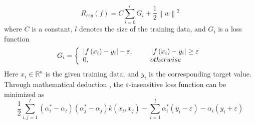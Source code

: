 \begin{equation}
{R_{reg}}\left( f \right) = C\sum\limits_{i = 0}^l {{G _i} +
    \frac{1}{2}{{\left\| w \right\|}^2}}
\label{eq:2}
\end{equation}
\textcolor{feb18rev}{where $C$ is a constant, $l$ denotes the size of
the training data, and ${G _i}$ is a loss function}
\begin{equation}
    {G _i} = \left\{ {\begin{array}{*{20}{l}} {\left| {f\left( {{x_i}} \right)
        - {y_i}} \right| - \varepsilon ,{\kern 1pt} {\kern 1pt} {\kern 1pt}
        {\kern 1pt} {\kern 1pt} {\kern 1pt} {\kern 1pt} {\kern 1pt} {\kern 1pt}
        {\kern 1pt} {\kern 1pt} {\kern 1pt} {\kern 1pt} {\kern 1pt} {\kern 1pt}
        {\kern 1pt} {\kern 1pt} {\kern 1pt} {\kern 1pt} {\kern 1pt} {\kern 1pt}
        {\kern 1pt} {\kern 1pt} {\kern 1pt} \left| {f\left( {{x_i}} \right) -
        {y_i}} \right| \ge \varepsilon }\\ {0,{\kern 1pt} {\kern 1pt} {\kern
        1pt} {\kern 1pt} {\kern 1pt} {\kern 1pt} {\kern 1pt} {\kern 1pt} {\kern
        1pt} {\kern 1pt} {\kern 1pt} {\kern 1pt} {\kern 1pt} {\kern 1pt} {\kern
        1pt} {\kern 1pt} {\kern 1pt} {\kern 1pt} {\kern 1pt} {\kern 1pt} {\kern
        1pt} {\kern 1pt} {\kern 1pt} {\kern 1pt} {\kern 1pt} {\kern 1pt} {\kern
        1pt} {\kern 1pt} {\kern 1pt} {\kern 1pt} {\kern 1pt} {\kern 1pt} {\kern
        1pt} {\kern 1pt} {\kern 1pt} {\kern 1pt} {\kern 1pt} {\kern 1pt} {\kern
        1pt} {\kern 1pt} {\kern 1pt} {\kern 1pt} {\kern 1pt} {\kern 1pt} {\kern
        1pt} {\kern 1pt} {\kern 1pt} {\kern 1pt} {\kern 1pt} {\kern 1pt} {\kern
        1pt} {\kern 1pt} {\kern 1pt} {\kern 1pt} {\kern 1pt} {\kern 1pt} {\kern
        1pt} {\kern 1pt} {\kern 1pt} {\kern 1pt} {\kern 1pt} {\kern 1pt} {\kern
        1pt} {\kern 1pt} {\kern 1pt} {\kern 1pt} {\kern 1pt} {\kern 1pt} {\kern
        1pt} {\kern 1pt} {\kern 1pt} {\kern 1pt} {\kern 1pt} {\kern 1pt} {\kern
        1pt} {\kern 1pt} {\kern 1pt} {\kern 1pt} {\kern 1pt} {\kern 1pt} {\kern
        1pt} {\kern 1pt} {\kern 1pt} {\kern 1pt} {\kern 1pt} {\kern 1pt} {\kern
        1pt} otherwise}
\end{array}} \right.
\end{equation}
\textcolor{feb18rev}{Here $x_i\in \mathbb{R}^n$ is the given training data, and
$y_i$ is the corresponding target value.} Through mathematical deduction
\cite{travel}, the $\varepsilon$-insensitive loss function can be
minimized as
\begin{equation}
\frac{1}{2}\sum\limits_{i,j = 1}^l {\left( {\alpha _i^* - {\alpha _i}}
    \right)\left( {\alpha _j^* - {\alpha _j}} \right)k\left( {{x_i},{x_j}}
    \right) - \sum\limits_{i = 1}^l {\alpha _i^*\left( {{y_i} - \varepsilon }
    \right)} }  - {\alpha _i}\left( {{y_i} + \varepsilon } \right)
\end{equation}
